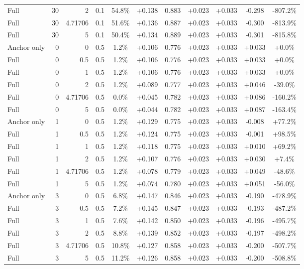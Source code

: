 \begin{table}[htbp]
\begin{tabular}{lrrrccccccc}
Full & 30 & 2 & 0.1 & 54.8\% & +0.138 & 0.883 & +0.023 & +0.033 & -0.298 & -807.2\% \\
Full & 30 & 4.71706 & 0.1 & 51.6\% & +0.136 & 0.887 & +0.023 & +0.033 & -0.300 & -813.9\% \\
Full & 30 & 5 & 0.1 & 50.4\% & +0.134 & 0.889 & +0.023 & +0.033 & -0.301 & -815.8\% \\
Anchor only & 0 & 0 & 0.5 & 1.2\% & +0.106 & 0.776 & +0.023 & +0.033 & +0.033 & +0.0\% \\
Full & 0 & 0.5 & 0.5 & 1.2\% & +0.106 & 0.776 & +0.023 & +0.033 & +0.033 & +0.0\% \\
Full & 0 & 1 & 0.5 & 1.2\% & +0.106 & 0.776 & +0.023 & +0.033 & +0.033 & +0.0\% \\
Full & 0 & 2 & 0.5 & 1.2\% & +0.089 & 0.777 & +0.023 & +0.033 & +0.046 & -39.0\% \\
Full & 0 & 4.71706 & 0.5 & 0.0\% & +0.045 & 0.782 & +0.023 & +0.033 & +0.086 & -160.2\% \\
Full & 0 & 5 & 0.5 & 0.0\% & +0.044 & 0.782 & +0.023 & +0.033 & +0.087 & -163.4\% \\
Anchor only & 1 & 0 & 0.5 & 1.2\% & +0.129 & 0.775 & +0.023 & +0.033 & -0.008 & +77.2\% \\
Full & 1 & 0.5 & 0.5 & 1.2\% & +0.124 & 0.775 & +0.023 & +0.033 & -0.001 & +98.5\% \\
Full & 1 & 1 & 0.5 & 1.2\% & +0.118 & 0.775 & +0.023 & +0.033 & +0.010 & +69.2\% \\
Full & 1 & 2 & 0.5 & 1.2\% & +0.107 & 0.776 & +0.023 & +0.033 & +0.030 & +7.4\% \\
Full & 1 & 4.71706 & 0.5 & 1.2\% & +0.078 & 0.779 & +0.023 & +0.033 & +0.049 & -48.6\% \\
Full & 1 & 5 & 0.5 & 1.2\% & +0.074 & 0.780 & +0.023 & +0.033 & +0.051 & -56.0\% \\
Anchor only & 3 & 0 & 0.5 & 6.8\% & +0.147 & 0.846 & +0.023 & +0.033 & -0.190 & -478.9\% \\
Full & 3 & 0.5 & 0.5 & 7.2\% & +0.145 & 0.847 & +0.023 & +0.033 & -0.193 & -487.2\% \\
Full & 3 & 1 & 0.5 & 7.6\% & +0.142 & 0.850 & +0.023 & +0.033 & -0.196 & -495.7\% \\
Full & 3 & 2 & 0.5 & 8.8\% & +0.139 & 0.852 & +0.023 & +0.033 & -0.197 & -498.2\% \\
Full & 3 & 4.71706 & 0.5 & 10.8\% & +0.127 & 0.858 & +0.023 & +0.033 & -0.200 & -507.7\% \\
Full & 3 & 5 & 0.5 & 11.2\% & +0.126 & 0.858 & +0.023 & +0.033 & -0.200 & -508.8\% \\

\end{tabular}
\end{table}
